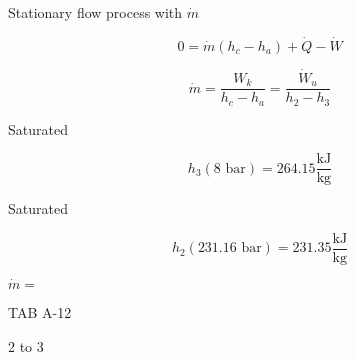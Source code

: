 Stationary flow process with \(\dot{m}\)

\[
0 = \dot{m}(h_c - h_a) + \dot{Q} - \dot{W}
\]

\[
\dot{m} = \frac{W_k}{h_c - h_a} = \frac{\dot{W}_u}{h_2 - h_3}
\]

Saturated

\[
h_3 (8 \text{ bar}) = 264.15 \frac{\text{kJ}}{\text{kg}}
\]

Saturated

\[
h_2 (231.16 \text{ bar}) = 231.35 \frac{\text{kJ}}{\text{kg}}
\]

\(\dot{m} = \)

TAB A-12

2 to 3